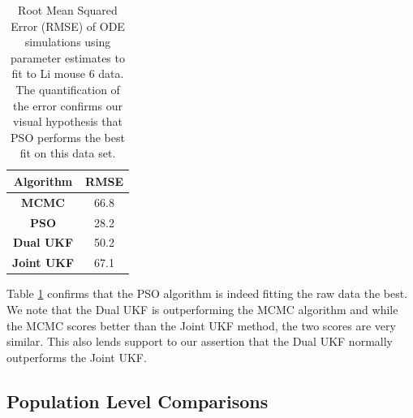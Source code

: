 \documentclass{article}
\begin{document}
\begin{table}[H]
  \begin{center}
    \label{tab:table1}
    \begin{tabular}{c|c} %
      \textbf{Algorithm} & \textbf{RMSE} \\
      \hline
      \textbf{MCMC} & 66.8\\
      \textbf{PSO} & 28.2\\
      \textbf{Dual UKF} & 50.2\\
      \textbf{Joint UKF} & 67.1
    \end{tabular}
    \caption{Root Mean Squared Error (RMSE) of ODE simulations using parameter estimates to fit to Li mouse 6 data. The quantification of the error confirms our visual hypothesis that PSO performs the best fit on this data set.}
    \label{table:Results_Mouse6_RMSE}
  \end{center}
\end{table}
Table \ref{table:Results_Mouse6_RMSE} confirms that the PSO algorithm is indeed fitting the raw data the best. We note that the Dual UKF is outperforming the MCMC algorithm and while the MCMC scores better than the Joint UKF method, the two scores are very similar. This also lends support to our assertion that the Dual UKF normally outperforms the Joint UKF. 


\subsection{Population Level Comparisons}
\end{document}

